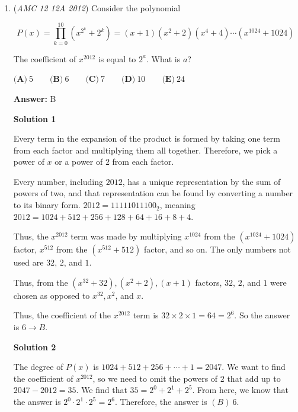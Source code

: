 \begin{enumerate}
 \textbf{Remark} This is similar to a certain 2023 Mathcounts Chapter Problem.....

 Uh just a comment, what problem on the 2023 Mathcounts Chapter is similar to this? I can't find any problem. -Mathman645

 The $n=2$ case is equivalent to Sprint problem $30.$ There is no flavortext, but the problem is the same.

 


	\item (\textit{AMC 12 12A 2012}) Consider the polynomial


 
 \[P(x)=\prod_{k=0}^{10}(x^{2^k}+2^k)=(x+1)(x^2+2)(x^4+4)\cdots (x^{1024}+1024)\]


 The coefficient of $x^{2012}$ is equal to $2^a$.  What is $a$?


 $\textbf{(A)}\ 5 \qquad\textbf{(B)}\ 6 \qquad\textbf{(C)}\ 7 \qquad\textbf{(D)}\ 10 \qquad\textbf{(E)}\ 24$

 \textbf{Answer: }B



\textbf{Solution 1}

Every term in the expansion of the product is formed by taking one term from each factor and multiplying them all together. Therefore, we pick a power of $x$ or a power of $2$ from each factor.

 Every number, including $2012$, has a unique representation by the sum of powers of two, and that representation can be found by converting a number to its binary form. $2012 = 11111011100_2$, meaning $2012 = 1024 + 512 + 256 + 128 + 64 + 16 + 8 + 4$. 

 Thus, the $x^{2012}$ term was made by multiplying $x^{1024}$ from the $(x^{1024} + 1024)$ factor, $x^{512}$ from the $(x^{512} + 512)$ factor, and so on. The only numbers not used are $32$, $2$, and $1$.

 Thus, from the $(x^{32} + 32), (x^2+2), (x+1)$ factors, $32$, $2$, and $1$ were chosen as opposed to $x^{32}, x^2$, and $x$. 

 Thus, the coefficient of the $x^{2012}$ term is $32 \times 2 \times 1 = 64 = 2^6$. So the answer is $6 \rightarrow \boxed{B}$.

 



\textbf{Solution 2}

The degree of $P(x)$ is $1024+512+256+\cdots+1=2047$. We want to find the coefficient of $x^{2012}$, so we need to omit the powers of $2$ that add up to $2047-2012=35$. We find that $35=2^0+2^1+2^5$. From here, we know that the answer is $2^0\cdot2^1\cdot2^5=2^6$. Therefore, the answer is $\boxed{(B)\:6.}$




\end{enumerate}
